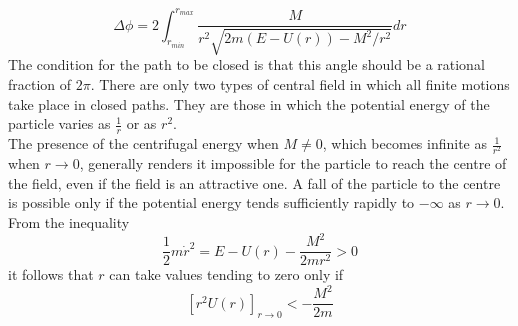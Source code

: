 \[\Delta \phi = 2 \int_{r_{min}}^{r_{max}} \frac{M}{r^2 \sqrt{2m(E-U(r))-M^2/r^2}} dr\]
The condition for the path to be closed is that this angle should be a rational fraction of $2\pi$. There are only two types of central field in which all finite motions take place in closed paths. They are those in which the potential energy of the particle varies as $\frac{1}{r}$ or as $r^2$.\\
The presence of the centrifugal energy when $M \neq 0$, which becomes infinite as $\frac{1}{r^2}$ when $r \to 0$, generally renders it impossible for the particle to reach the centre of the field, even if the field is an attractive one. 
A fall of the particle to the centre is possible only if the potential energy tends sufficiently rapidly to $-\infty$ as $r \to 0$. From the inequality
\[\frac{1}{2} m\dot{r}^2 = E - U(r) - \frac{M^2}{2mr^2} > 0\]
it follows that $r$ can take values tending to zero only if
\[[r^2 U(r)]_{r\to 0} < -\frac{M^2}{2m}\]

